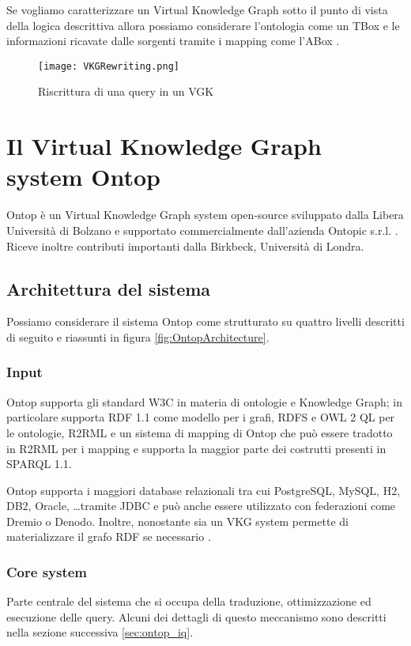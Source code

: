 Se vogliamo caratterizzare un Virtual Knowledge Graph sotto il punto di vista della logica descrittiva allora possiamo considerare l'ontologia come un TBox e le informazioni ricavate dalle sorgenti 
tramite i mapping come l'ABox \cite{OBDA} \cite{VKGOverview}. 


\begin{figure}[ht]
    \centering
    \texttt{[image: VKGRewriting.png]}
    \caption{Riscrittura di una query in un VGK}
    \label{fig:VKGRewriting}
\end{figure}


\section{Il Virtual Knowledge Graph system Ontop}
\label{sec:vkg_ontop}
Ontop è un Virtual Knowledge Graph system open-source sviluppato dalla Libera Università di Bolzano e supportato commercialmente dall'azienda Ontopic s.r.l. . 
Riceve inoltre contributi importanti dalla Birkbeck, Università di Londra.

\subsection{Architettura del sistema}
Possiamo considerare il sistema Ontop come strutturato su quattro livelli descritti di seguito e riassunti in figura \ref{fig:OntopArchitecture}.
\subsubsection*{Input}
Ontop supporta gli standard W3C in materia di ontologie e Knowledge Graph; in particolare supporta RDF 1.1 come modello per i grafi, RDFS e OWL 2 QL per le
ontologie, R2RML e un sistema di mapping di Ontop che può essere tradotto in R2RML per i mapping e supporta la maggior parte dei costrutti presenti in SPARQL 1.1.

Ontop supporta i maggiori database relazionali tra cui PostgreSQL, MySQL, H2, DB2, Oracle, \dots tramite JDBC e può anche essere utilizzato con federazioni come 
Dremio o Denodo. Inoltre, nonostante sia un VKG system permette di materializzare il grafo RDF se necessario \cite{OntopArchitecture}.

\subsubsection*{Core system}
Parte centrale del sistema che si occupa della traduzione, ottimizzazione ed esecuzione delle query. Alcuni dei dettagli di questo meccanismo sono descritti nella
sezione successiva \ref{sec:ontop_iq}.
